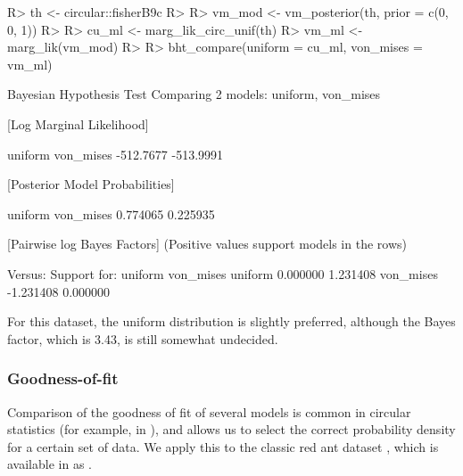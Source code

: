 \begin{CodeChunk}

\begin{CodeInput}
R> th <- circular::fisherB9c
R> 
R> vm_mod <- vm_posterior(th, prior = c(0, 0, 1))
R> 
R> cu_ml  <- marg_lik_circ_unif(th)
R> vm_ml  <- marg_lik(vm_mod)
R> 
R> bht_compare(uniform = cu_ml, von_mises = vm_ml)
\end{CodeInput}

\begin{CodeOutput}
Bayesian Hypothesis Test
    Comparing 2 models: uniform, von_mises

[Log Marginal Likelihood]

  uniform von_mises 
-512.7677 -513.9991 


[Posterior Model Probabilities]

  uniform von_mises 
 0.774065  0.225935 


[Pairwise log Bayes Factors]
  (Positive values support models in the rows)

               Versus: 
Support for:      uniform von_mises
      uniform    0.000000  1.231408
      von_mises -1.231408  0.000000
\end{CodeOutput}
\end{CodeChunk}

For this dataset, the uniform distribution is slightly preferred,
although the Bayes factor, which is 3.43, is still somewhat undecided.

\hypertarget{goodness-of-fit}{%
\subsubsection{Goodness-of-fit}\label{goodness-of-fit}}

Comparison of the goodness of fit of several models is common in
circular statistics (for example, in \citet{pewsey2013circular}), and
allows us to select the correct probability density for a certain set of
data. We apply this to the classic red ant dataset
\citep{jander1957optische, fisher1995statistical}, which is available in
 as .

